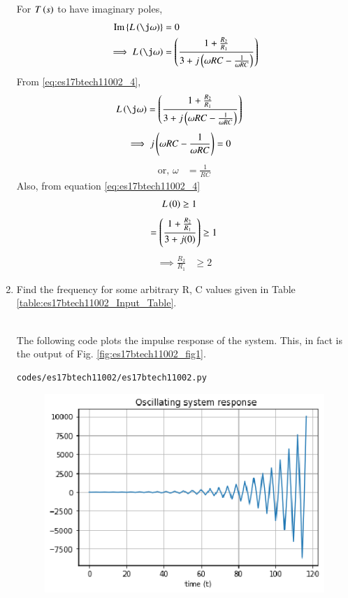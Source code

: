 \begin{enumerate}[label=\arabic*.,ref=\theenumi]
For $T\left(s\right)$ to have imaginary poles, 
\begin{align}
\text{Im}\cbrak{L\brak{\j \omega}} &= 0
\\
\implies L\brak{\j\omega}&= \brak{\frac{1+\frac{R_{2}}{R_{1}}}{3+ j \brak{\omega RC-\frac{1}{\omega RC}}}}
\end{align}
From \eqref{eq:es17btech11002_4},
\begin{align}
 L\brak{\j\omega} &=\brak{\frac{1+\frac{R_{2}}{R_{1}}}{3+j \brak{\omega RC-\frac{1}{\omega RC}}}}
\end{align} 
\begin{align}
\implies j\left(\omega RC - \frac{1}{\omega RC}\right) &= 0
\end{align}
\begin{align}
\text{or, } \omega &= \frac{1}{RC}
\label{eq:es17btech11002_freq}
\end{align}
Also, from equation \eqref{eq:es17btech11002_4}
\begin{align}
L\left(0\right) &\ge 1
\end{align}
\begin{align}
= \left(\frac{1+\frac{R_{2}}{R_{1}}}{3+j(0)}\right) \geq 1
\end{align}
\begin{align}
\implies \frac{R_{2}}{R_{1}} &\geq 2
\end{align}
%
\item Find the frequency for some arbitrary R, C values given in Table \ref{table:es17btech11002_Input_Table}.\\
\begin{table}[!ht]
\centering

\caption{}
\label{table:es17btech11002_Input_Table}
\end{table}
\\
\solution 
%
The following code plots the impulse  response of the system.  This, in fact is the output of Fig. \ref{fig:es17btech11002_fig1}.
\begin{lstlisting}
codes/es17btech11002/es17btech11002.py
\end{lstlisting}
\begin{figure}[!ht]
\centering
\includegraphics[width=\columnwidth]{./figs/es17btech11002/es17btech11002.eps}

\end{figure}
\end{enumerate}
